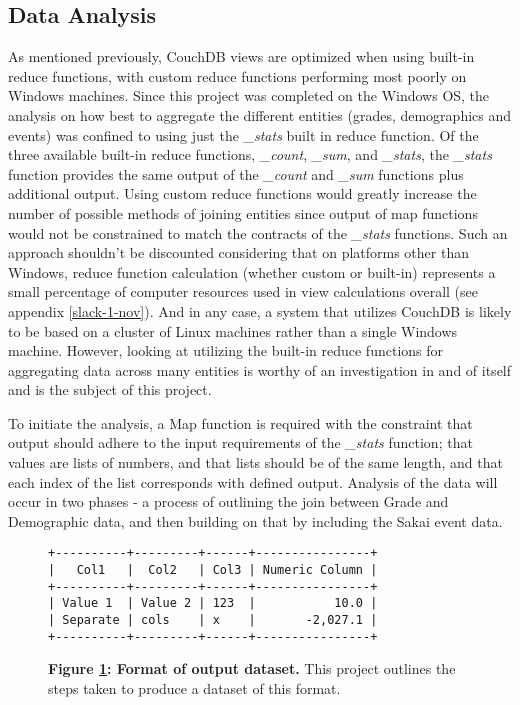 \subsection{Data Analysis}
As mentioned previously, CouchDB views are optimized when using built-in reduce functions, with custom reduce functions performing most poorly on Windows machines. Since this project was completed on the Windows OS, the analysis on how best to aggregate the different entities (grades, demographics and events) was confined to using just the \textit{\_stats} built in reduce function. Of the three available built-in reduce functions, \textit{\_count}, \textit{\_sum}, and \textit{\_stats}, the \textit{\_stats} function provides the same output of the \textit{\_count} and \textit{\_sum} functions plus additional output. Using custom reduce functions would greatly increase the number of possible methods of joining entities since output of map functions would not be constrained to match the contracts of the \textit{\_stats} functions. Such an approach shouldn't be discounted considering that on platforms other than Windows, reduce function calculation (whether custom or built-in) represents a small percentage of computer resources used in view calculations overall (see appendix \ref{slack-1-nov}). And in any case, a system that utilizes CouchDB is likely to be based on a cluster of Linux machines rather than a single Windows machine. However, looking at utilizing the built-in reduce functions for aggregating data across many entities is worthy of an investigation in and of itself and is the subject of this project.

To initiate the analysis, a Map function is required with the constraint that output should adhere to the input requirements of the \textit{\_stats} function; that values are lists of numbers, and that lists should be of the same length, and that each index of the list corresponds with defined output. Analysis of the data will occur in two phases - a process of outlining the join between Grade and Demographic data, and then building on that by including the Sakai event data.

\begin{figure}[ht]
    \centering
    \begin{verbatim}
+----------+---------+------+----------------+
|   Col1   |  Col2   | Col3 | Numeric Column |
+----------+---------+------+----------------+
| Value 1  | Value 2 | 123  |           10.0 |
| Separate | cols    | x    |       -2,027.1 |
+----------+---------+------+----------------+
    \end{verbatim}
    \caption[Analysis dataset output format]{\textbf{Figure \ref{dataset-output}: Format of output dataset.} This project outlines the steps taken to produce a dataset of this format.}
    \label{dataset-output}
\end{figure}

